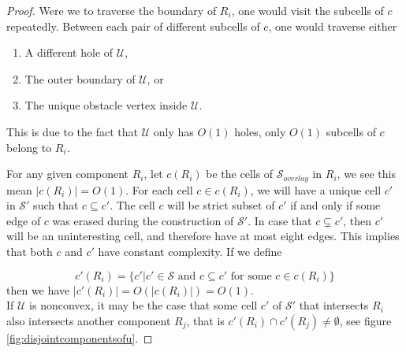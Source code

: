 \begin{proof}

Were we to traverse the boundary of $R_i$, one would visit the subcells of $c$ repeatedly. 
Between each pair of different subcells of $c$, one would traverse either

\begin{enumerate}
\item A different hole of $\mathcal{U}$,
\item The outer boundary of $\mathcal{U}$, or
\item The unique obstacle vertex inside $\mathcal{U}$.
\end{enumerate}

This is due to the fact that $\mathcal{U}$ only has $O(1)$ holes, only $O(1)$ subcells 
of $c$ belong to $R_i$. 

For any given component $R_i$, let $c(R_i)$ be the cells of $\mathcal{S}_{overlay}$ in $R_i$, 
we see this mean $|c(R_i)| = O(1)$. For each cell $c\in c(R_i)$, we will have a unique cell $c'$ 
in $\mathcal{S}'$ such that $c \subseteq c'$. The cell $c$ will be strict subset of $c'$ if 
and only if some edge of $c$ was erased during the construction of $\mathcal{S}'$. 
In case that $c \subsetneq c'$, then $c'$ will be an uninteresting cell, and therefore have at 
most eight edges. This implies that both $c$ and $c'$ have constant complexity. 
If we define

$$c'(R_i)=\{c'|c'\in\mathcal{S} \text{ and } c \subseteq c' \text{ for some } c\in c(R_i)\}$$
then we have $|c'(R_i)| = O(|c(R_i)|) = O(1)$. \\

If $\mathcal{U}$ is nonconvex, it may be the case that some cell $c'$ of $\mathcal{S}'$ that 
intersects $R_i$ also intersects another component $R_j$, that is $c'(R_i)\cap c'(R_j) \neq 
\emptyset$, see figure \ref{fig:disjointcomponentsofu}.


\end{proof}
